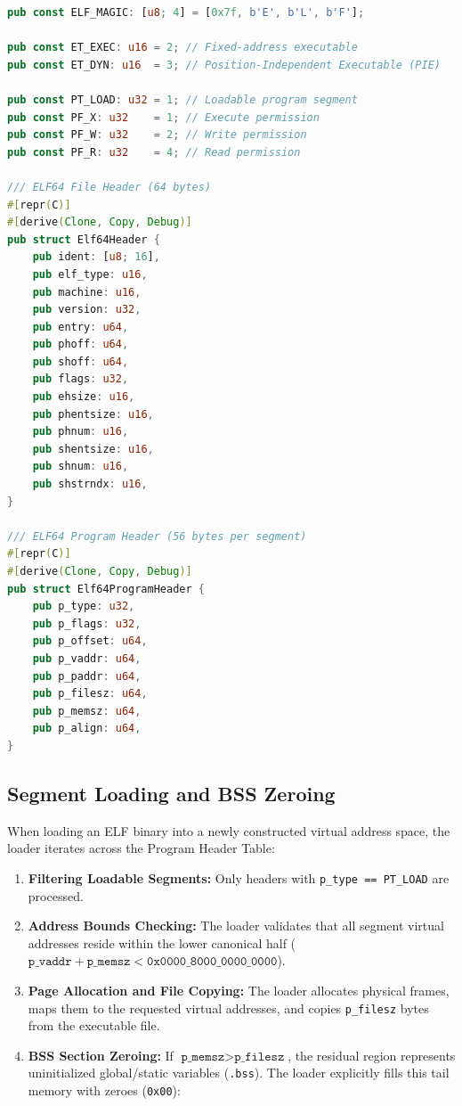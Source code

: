 \begin{lstlisting}[language=Rust, caption={ELF64 File and Program Header Structures (\texttt{src/task/elf.rs})}]
pub const ELF_MAGIC: [u8; 4] = [0x7f, b'E', b'L', b'F'];

pub const ET_EXEC: u16 = 2; // Fixed-address executable
pub const ET_DYN: u16  = 3; // Position-Independent Executable (PIE)

pub const PT_LOAD: u32 = 1; // Loadable program segment
pub const PF_X: u32    = 1; // Execute permission
pub const PF_W: u32    = 2; // Write permission
pub const PF_R: u32    = 4; // Read permission

/// ELF64 File Header (64 bytes)
#[repr(C)]
#[derive(Clone, Copy, Debug)]
pub struct Elf64Header {
    pub ident: [u8; 16],
    pub elf_type: u16,
    pub machine: u16,
    pub version: u32,
    pub entry: u64,
    pub phoff: u64,
    pub shoff: u64,
    pub flags: u32,
    pub ehsize: u16,
    pub phentsize: u16,
    pub phnum: u16,
    pub shentsize: u16,
    pub shnum: u16,
    pub shstrndx: u16,
}

/// ELF64 Program Header (56 bytes per segment)
#[repr(C)]
#[derive(Clone, Copy, Debug)]
pub struct Elf64ProgramHeader {
    pub p_type: u32,
    pub p_flags: u32,
    pub p_offset: u64,
    pub p_vaddr: u64,
    pub p_paddr: u64,
    pub p_filesz: u64,
    pub p_memsz: u64,
    pub p_align: u64,
}
\end{lstlisting}

\subsection{Segment Loading and BSS Zeroing}

When loading an ELF binary into a newly constructed virtual address space, the loader iterates across the Program Header Table:
\begin{enumerate}
    \item \textbf{Filtering Loadable Segments:} Only headers with \texttt{p\_type == PT\_LOAD} are processed.
    \item \textbf{Address Bounds Checking:} The loader validates that all segment virtual addresses reside within the lower canonical half ($\texttt{p\_vaddr} + \texttt{p\_memsz} < \texttt{0x0000\_8000\_0000\_0000}$).
    \item \textbf{Page Allocation and File Copying:} The loader allocates physical frames, maps them to the requested virtual addresses, and copies \texttt{p\_filesz} bytes from the executable file.
    \item \textbf{BSS Section Zeroing:} If $\texttt{p\_memsz} > \texttt{p\_filesz}$, the residual region represents uninitialized global/static variables (\texttt{.bss}). The loader explicitly fills this tail memory with zeroes (\texttt{0x00}):
\end{enumerate}

